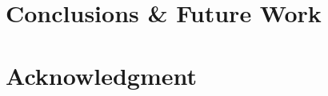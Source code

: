 \documentclass[conference]{IEEEtran}
\begin{document}
\section{Conclusions \& Future Work}\label{sec:conclusion}




\section*{Acknowledgment}







%
%
%




\end{document}
